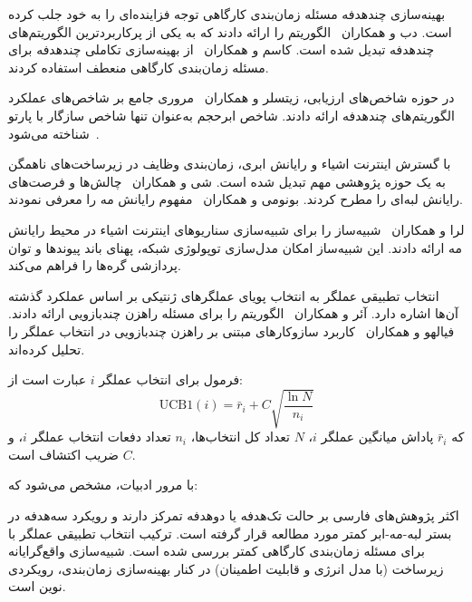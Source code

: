 
بهینه‌سازی چندهدفه مسئله زمان‌بندی کارگاهی توجه فزاینده‌ای را به خود جلب کرده است.
دب و همکاران~\cite{deb2002fast} الگوریتم  را ارائه دادند
که به یکی از پرکاربردترین الگوریتم‌های چندهدفه تبدیل شده است.
کاسم و همکاران~\cite{kacem2002approach} از بهینه‌سازی تکاملی چندهدفه
برای مسئله زمان‌بندی کارگاهی منعطف استفاده کردند.

در حوزه شاخص‌های ارزیابی، زیتسلر و همکاران~\cite{zitzler2003performance}
مروری جامع بر شاخص‌های عملکرد الگوریتم‌های چندهدفه ارائه دادند.
شاخص ابرحجم به‌عنوان تنها شاخص سازگار با پارتو شناخته می‌شود~\cite{while2012fast}.



با گسترش اینترنت اشیاء و رایانش ابری، زمان‌بندی وظایف در زیرساخت‌های ناهمگن
به یک حوزه پژوهشی مهم تبدیل شده است.
شی و همکاران~\cite{shi2016edge} چالش‌ها و فرصت‌های رایانش لبه‌ای را مطرح کردند.
بونومی و همکاران~\cite{bonomi2012fog} مفهوم رایانش مه را معرفی نمودند.

لرا و همکاران~\cite{lera2019yafs} شبیه‌ساز  را برای شبیه‌سازی سناریوهای اینترنت اشیاء
در محیط رایانش مه ارائه دادند.
این شبیه‌ساز امکان مدل‌سازی توپولوژی شبکه، پهنای باند پیوندها
و توان پردازشی گره‌ها را فراهم می‌کند.



انتخاب تطبیقی عملگر
به انتخاب پویای عملگرهای ژنتیکی بر اساس عملکرد گذشته آن‌ها اشاره دارد.
آئر و همکاران~\cite{auer2002finite} الگوریتم  را
برای مسئله راهزن چندبازویی ارائه دادند.
فیالهو و همکاران~\cite{fialho2010analyzing} کاربرد سازوکارهای مبتنی بر راهزن چندبازویی
در انتخاب عملگر را تحلیل کرده‌اند.

فرمول  برای انتخاب عملگر $i$ عبارت است از:
\begin{equation}
\text{UCB1}(i) = \bar{r}_i + C \sqrt{\frac{\ln N}{n_i}}
\end{equation}
که $\bar{r}_i$ پاداش میانگین عملگر $i$، $N$ تعداد کل انتخاب‌ها،
$n_i$ تعداد دفعات انتخاب عملگر $i$، و $C$ ضریب اکتشاف است.



با مرور ادبیات، مشخص می‌شود که:

 اکثر پژوهش‌های فارسی بر حالت تک‌هدفه یا دوهدفه تمرکز دارند
و رویکرد سه‌هدفه در بستر لبه-مه-ابر کمتر مورد مطالعه قرار گرفته است.
 ترکیب انتخاب تطبیقی عملگر با  برای مسئله زمان‌بندی کارگاهی
کمتر بررسی شده است.
 شبیه‌سازی واقع‌گرایانه زیرساخت (با مدل انرژی و قابلیت اطمینان)
در کنار بهینه‌سازی زمان‌بندی، رویکردی نوین است.

